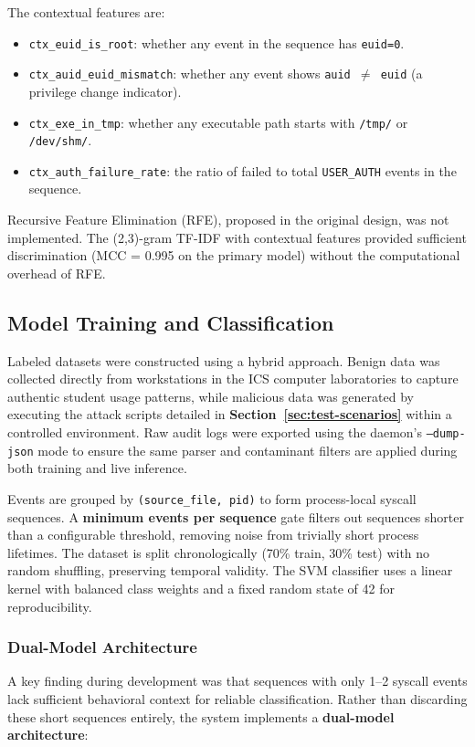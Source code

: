 \documentclass[journal]{./IEEEtran}
\begin{document}
The contextual features are:
\begin{itemize}
    \item \texttt{ctx\_euid\_is\_root}: whether any event in the sequence has \texttt{euid=0}.
    \item \texttt{ctx\_auid\_euid\_mismatch}: whether any event shows \texttt{auid $\neq$ euid} (a privilege change indicator).
    \item \texttt{ctx\_exe\_in\_tmp}: whether any executable path starts with \texttt{/tmp/} or \texttt{/dev/shm/}.
    \item \texttt{ctx\_auth\_failure\_rate}: the ratio of failed to total \texttt{USER\_AUTH} events in the sequence.
\end{itemize}

Recursive Feature Elimination (RFE), proposed in the original design, was not implemented. The (2,3)-gram TF-IDF with contextual features provided sufficient discrimination (MCC = 0.995 on the primary model) without the computational overhead of RFE.

\subsection{Model Training and Classification}
Labeled datasets were constructed using a hybrid approach. Benign data was collected directly from workstations in the ICS computer laboratories to capture authentic student usage patterns, while malicious data was generated by executing the attack scripts detailed in \textbf{Section~\ref{sec:test-scenarios}} within a controlled environment. Raw audit logs were exported using the daemon's \texttt{--dump-json} mode to ensure the same parser and contaminant filters are applied during both training and live inference.

Events are grouped by \texttt{(source\_file, pid)} to form process-local syscall sequences. A \textbf{minimum events per sequence} gate filters out sequences shorter than a configurable threshold, removing noise from trivially short process lifetimes. The dataset is split chronologically (70\% train, 30\% test) with no random shuffling, preserving temporal validity. The SVM classifier uses a linear kernel with balanced class weights and a fixed random state of 42 for reproducibility.

\subsubsection{Dual-Model Architecture}
A key finding during development was that sequences with only 1--2 syscall events lack sufficient behavioral context for reliable classification. Rather than discarding these short sequences entirely, the system implements a \textbf{dual-model architecture}:
\end{document}
